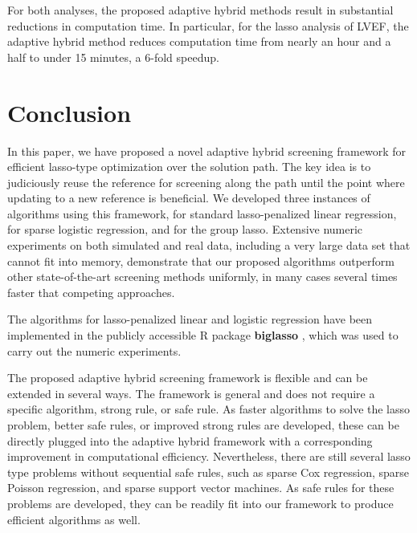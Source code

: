 \documentclass[]{interact}
\theoremstyle{plain}%
\theoremstyle{definition}
\theoremstyle{remark}
\begin{document}
For both analyses, the proposed adaptive hybrid methods result in substantial reductions in computation time. In particular, for the lasso analysis of LVEF, the adaptive hybrid method reduces computation time from nearly an hour and a half to under 15 minutes, a 6-fold speedup.

\section{Conclusion}
\label{sec:6}

In this paper, we have proposed a novel adaptive hybrid screening framework for efficient lasso-type optimization over the solution path. The key idea is to judiciously reuse the reference for screening along the path until the point where updating to a new reference is beneficial.  We developed three instances of algorithms using this framework, for standard lasso-penalized linear regression, for sparse logistic regression, and for the group lasso. Extensive numeric experiments on both simulated and real data, including a very large data set that cannot fit into memory, demonstrate that our proposed algorithms outperform other state-of-the-art screening methods uniformly, in many cases several times faster that competing approaches.

The algorithms for lasso-penalized linear and logistic regression have been implemented in the publicly accessible R package \textbf{biglasso} \citep{zeng2017biglasso}, which was used to carry out the numeric experiments.

The proposed adaptive hybrid screening framework is flexible and can be extended in several ways. The framework is general and does not require a specific algorithm, strong rule, or safe rule. As faster algorithms to solve the lasso problem, better safe rules, or improved strong rules are developed, these can be directly plugged into the adaptive hybrid framework with a corresponding improvement in computational efficiency. Nevertheless, there are still several lasso type problems without sequential safe rules, such as sparse Cox regression, sparse Poisson regression, and sparse support vector machines. As safe rules for these problems are developed, they can be readily fit into our framework to produce efficient algorithms as well.
\end{document}
